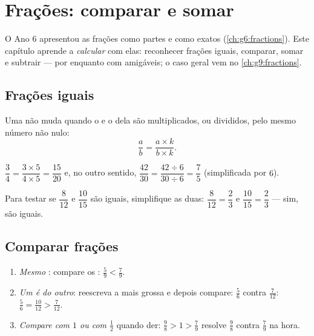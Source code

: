 \chapter{Frações: comparar e somar}\label{ch:g7:fractions}

O Ano 6 apresentou as frações como partes e como  exatos
(\cref{ch:g6:fractions}). Este capítulo aprende a \emph{calcular} com
elas: reconhecer frações iguais, comparar, somar e subtrair --- por
enquanto com  amigáveis; o caso geral vem no
\cref{ch:g9:fractions}.

\section{Frações iguais}

\begin{theorem}\label{thm:g7:fractions:equal}
Uma  não muda quando o  e o  dela são
multiplicados, ou divididos, pelo mesmo número não nulo:
\[
\frac{a}{b} = \frac{a \times k}{b \times k} .
\]
\end{theorem}
\admitted

\begin{example}\label{ex:g7:fractions:equal}
$\dfrac{3}{4} = \dfrac{3 \times 5}{4 \times 5} = \dfrac{15}{20}$ e, no
outro sentido, $\dfrac{42}{30} = \dfrac{42 \div 6}{30 \div 6}
= \dfrac{7}{5}$ (simplificada por $6$).

Para testar se $\dfrac{8}{12}$ e $\dfrac{10}{15}$ são iguais,
simplifique as duas: $\dfrac{8}{12} = \dfrac{2}{3}$ e
$\dfrac{10}{15} = \dfrac{2}{3}$ --- sim, são iguais.
\end{example}

\section{Comparar frações}

\begin{method}\label{met:g7:fractions:compare}
\begin{enumerate}
  \item \emph{Mesmo }: compare os :
        $\frac{5}{9} < \frac{7}{9}$.
  \item \emph{Um  é  do outro}: reescreva a 
        mais grossa e depois compare: $\frac{5}{6}$ contra
        $\frac{7}{12}$: $\frac56 = \frac{10}{12} > \frac{7}{12}$.
  \item \emph{Compare com $1$ ou com $\frac12$} quando der:
        $\frac{9}{8} > 1 > \frac{7}{9}$ resolve $\frac98$ contra
        $\frac79$ na hora.
\end{enumerate}
\end{method}

